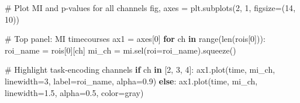 \documentclass[
  11pt,
  letterpaper,
  oneside,
  openany]{book}
\newenvironment{Shaded}{\begin{snugshade}}{\end{snugshade}}
\newcommand{\BuiltInTok}[1]{\textcolor[rgb]{0.00,0.23,0.31}{#1}}
\newcommand{\CommentTok}[1]{\textcolor[rgb]{0.37,0.37,0.37}{#1}}
\newcommand{\ControlFlowTok}[1]{\textcolor[rgb]{0.00,0.23,0.31}{\textbf{#1}}}
\newcommand{\DecValTok}[1]{\textcolor[rgb]{0.68,0.00,0.00}{#1}}
\newcommand{\FloatTok}[1]{\textcolor[rgb]{0.68,0.00,0.00}{#1}}
\newcommand{\KeywordTok}[1]{\textcolor[rgb]{0.00,0.23,0.31}{\textbf{#1}}}
\newcommand{\NormalTok}[1]{\textcolor[rgb]{0.00,0.23,0.31}{#1}}
\newcommand{\OperatorTok}[1]{\textcolor[rgb]{0.37,0.37,0.37}{#1}}
\newcommand{\StringTok}[1]{\textcolor[rgb]{0.13,0.47,0.30}{#1}}
\begin{document}
\begin{Shaded}
\begin{Highlighting}[]
\CommentTok{\# Plot MI and p{-}values for all channels}
\NormalTok{fig, axes }\OperatorTok{=}\NormalTok{ plt.subplots(}\DecValTok{2}\NormalTok{, }\DecValTok{1}\NormalTok{, figsize}\OperatorTok{=}\NormalTok{(}\DecValTok{14}\NormalTok{, }\DecValTok{10}\NormalTok{))}

\CommentTok{\# Top panel: MI timecourses}
\NormalTok{ax1 }\OperatorTok{=}\NormalTok{ axes[}\DecValTok{0}\NormalTok{]}
\ControlFlowTok{for}\NormalTok{ ch }\KeywordTok{in} \BuiltInTok{range}\NormalTok{(}\BuiltInTok{len}\NormalTok{(rois[}\DecValTok{0}\NormalTok{])):}
\NormalTok{    roi\_name }\OperatorTok{=}\NormalTok{ rois[}\DecValTok{0}\NormalTok{][ch]}
\NormalTok{    mi\_ch }\OperatorTok{=}\NormalTok{ mi.sel(roi}\OperatorTok{=}\NormalTok{roi\_name).squeeze()}
    
    \CommentTok{\# Highlight task{-}encoding channels}
    \ControlFlowTok{if}\NormalTok{ ch }\KeywordTok{in}\NormalTok{ [}\DecValTok{2}\NormalTok{, }\DecValTok{3}\NormalTok{, }\DecValTok{4}\NormalTok{]:}
\NormalTok{        ax1.plot(time, mi\_ch, linewidth}\OperatorTok{=}\DecValTok{3}\NormalTok{, label}\OperatorTok{=}\NormalTok{roi\_name, alpha}\OperatorTok{=}\FloatTok{0.9}\NormalTok{)}
    \ControlFlowTok{else}\NormalTok{:}
\NormalTok{        ax1.plot(time, mi\_ch, linewidth}\OperatorTok{=}\FloatTok{1.5}\NormalTok{, alpha}\OperatorTok{=}\FloatTok{0.5}\NormalTok{, color}\OperatorTok{=}\StringTok{\textquotesingle{}gray\textquotesingle{}}\NormalTok{)}


\end{Highlighting}
\end{Shaded}
\end{document}
